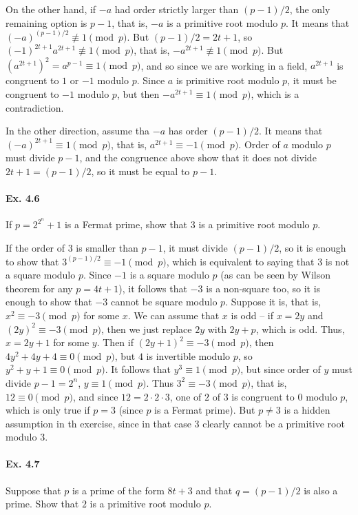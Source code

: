 \documentclass[notitlepage]{article}
\theoremstyle{definition}
\begin{document}
On the other hand, if $-a$ had order strictly larger than $(p-1)/2$,
the only remaining option is $p-1$, that is, $-a$ is a primitive root
modulo $p$. It means that $(-a)^{(p-1)/2} \not \equiv 1 \pmod p$. But
$(p-1)/2 = 2t + 1$, so $(-1)^{2t+1} a^{2t+1} \not \equiv 1 \pmod p$,
that is, $-a^{2t+1} \not \equiv 1 \pmod p$. But $(a^{2t+1})^2 =
a^{p-1} \equiv 1 \pmod p$, and so since we are working in a field,
$a^{2t+1}$ is congruent to $1$ or $-1$ modulo $p$. Since $a$ is
primitive root modulo $p$, it must be congruent to $-1$ modulo $p$,
but then $-a^{2t+1} \equiv 1 \pmod p$, which is a contradiction.

In the other direction, assume tha $-a$ has order $(p - 1)/2$. It
means that $(-a)^{2t+1} \equiv 1 \pmod p$, that is, $a^{2t+1} \equiv
-1 \pmod p$. Order of $a$ modulo $p$ must divide $p-1$, and the
congruence above show that it does not divide $2t+1 = (p-1)/2$, so it
must be equal to $p-1$.

\paragraph{Ex. 4.6}
If $p = 2^{2^n} + 1$ is a Fermat prime, show that $3$ is a primitive root
modulo $p$.

If the order of $3$ is smaller than $p-1$, it must divide $(p-1)/2$,
so it is enough to show that $3^{(p-1)/2} \equiv -1 \pmod p$, which is
equivalent to saying that $3$ is not a square modulo $p$. Since $-1$
is a square modulo $p$ (as can be seen by Wilson theorem for any $p =
4t +1$), it follows that $-3$ is a non-square too, so it is enough to
show that $-3$ cannot be square modulo $p$. Suppose it is, that is,
$x^2 \equiv -3 \pmod p$ for some $x$. We can assume that $x$ is odd --
if $x = 2y$ and $(2y)^2 \equiv -3 \pmod p$, then we just replace $2y$
with $2y+p$, which is odd. Thus, $x = 2y+1$ for some $y$. Then if
$(2y+1)^2 \equiv -3 \pmod p$, then $4y^2 + 4y + 4 \equiv 0 \pmod p$,
but $4$ is invertible modulo $p$, so $y^2 + y + 1 \equiv 0 \pmod
p$. It follows that $y^3 \equiv 1 \pmod p$, but since order of $y$
must divide $p-1 = 2^n$, $y \equiv 1 \pmod p$. Thus $3^2 \equiv -3
\pmod p$, that is, $12 \equiv 0 \pmod p$, and since $12 =
2\cdot2\cdot3$, one of $2$ of $3$ is congruent to $0$ modulo $p$,
which is only true if $p = 3$ (since $p$ is a Fermat prime). But $p
\ne 3$ is a hidden assumption in th exercise, since in that case $3$
clearly cannot be a primitive root modulo $3$.

\paragraph{Ex. 4.7}
Suppose that $p$ is a prime of the form $8t + 3$ and that $q = (p -
1)/2$ is also a prime.  Show that $2$ is a primitive root modulo $p$.
\end{document}
